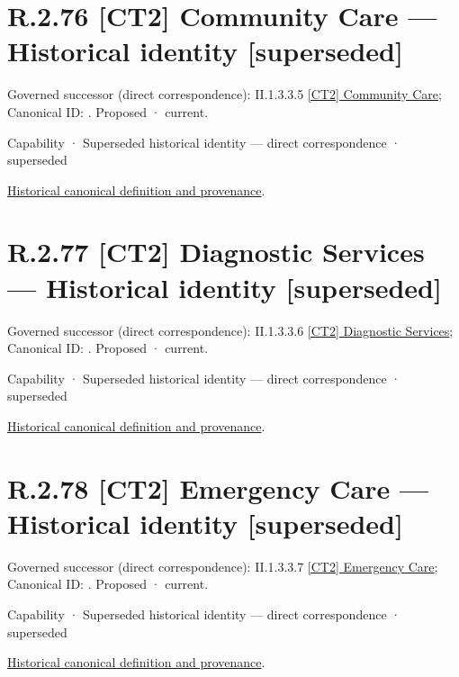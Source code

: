 \section*{R.2.76 [CT2] Community Care — Historical identity [superseded]}
\label{navigation:R.2.76}

{\small Governed successor (direct correspondence): II.1.3.3.5 \hyperref[element:942aa78cad004ef99de6b3aae8ddd014]{[CT2] Community Care}; Canonical ID: \texttt{}. Proposed · current.}\par
\label{element:4b7177f3f40449518fba381acae6ba1e}
{\small Capability · Superseded historical identity — direct correspondence · superseded}\par
\href{../../../../continuum/strategy/capability/4b7177f3f40449518fba381acae6ba1e.md}{Historical canonical definition and provenance}.\par
\section*{R.2.77 [CT2] Diagnostic Services — Historical identity [superseded]}
\label{navigation:R.2.77}

{\small Governed successor (direct correspondence): II.1.3.3.6 \hyperref[element:b825ebab42f444d8b738b4c1f489f785]{[CT2] Diagnostic Services}; Canonical ID: \texttt{}. Proposed · current.}\par
\label{element:03a57e0c9ea34f7fb7b78e5f5c85379f}
{\small Capability · Superseded historical identity — direct correspondence · superseded}\par
\href{../../../../continuum/strategy/capability/03a57e0c9ea34f7fb7b78e5f5c85379f.md}{Historical canonical definition and provenance}.\par
\section*{R.2.78 [CT2] Emergency Care — Historical identity [superseded]}
\label{navigation:R.2.78}

{\small Governed successor (direct correspondence): II.1.3.3.7 \hyperref[element:aa088f0647ad4b78966fe28fa80af674]{[CT2] Emergency Care}; Canonical ID: \texttt{}. Proposed · current.}\par
\label{element:e5edbb54258c490aaba0816d980dc624}
{\small Capability · Superseded historical identity — direct correspondence · superseded}\par
\href{../../../../continuum/strategy/capability/e5edbb54258c490aaba0816d980dc624.md}{Historical canonical definition and provenance}.\par
